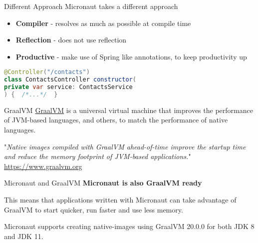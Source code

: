 \documentclass{beamer}
\begin{document}
  \begin{frame}[t,fragile]{Different Approach}
    Micronaut takes a different approach

    \begin{itemize}
      \item \textbf{Compiler} - resolves as much as possible at compile time
      \item \textbf{Reflection} - does not use reflection
      \item \textbf{Productive} - make use of Spring like annotations, to keep productivity up
    \end{itemize}

    \vspace{16pt}
    \begin{lstlisting}[language=Java, backgroundcolor = \color{green!5}]
@Controller("/contacts")
class ContactsController constructor(
private var service: ContactsService
) {  /*...*/  }
    \end{lstlisting}

  \end{frame}


  \begin{frame}[t]{GraalVM}
    \href{https://www.graalvm.org/}{GraalVM} is a universal virtual machine that improves the performance of JVM-based languages, and others, to match the performance of native languages.

    \vspace{16pt}
    "\textit{Native images compiled with GraalVM ahead-of-time improve the startup time and reduce the memory footprint of JVM-based applications.}"
    \newline
    {\footnotesize \href{https://www.graalvm.org}{https://www.graalvm.org}}
  \end{frame}


  \begin{frame}[t]{Micronaut and GraalVM}
    \textbf{Micronaut is also GraalVM ready}

    \vspace{16pt}
    This means that applications written with Micronaut can take advantage of GraalVM to start quicker, run faster and use less memory.

    Micronaut supports creating native-images using GraalVM 20.0.0 for both JDK 8 and JDK 11.
  \end{frame}
\end{document}
